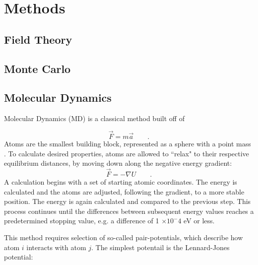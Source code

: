 \documentclass[3p,review,12pt]{elsarticle}
\begin{document}
\section{Methods}


\subsection{Field Theory}

\subsection{Monte Carlo}

\subsection{Molecular Dynamics}

Molecular Dynamics (MD) is a classical method built off of

\begin{equation}
\vec{F}=m\vec{a} \qquad .
\end{equation}
Atoms are the smallest building block, represented as a sphere with a point mass \cite{Lee2012}. To calculate desired properties, atoms are allowed to ``relax" to their respective equilibrium distances, by moving down along the negative energy gradient:
\begin{equation}
\vec{F} = - \nabla U \qquad .
\end{equation}
A calculation begins with a set of starting atomic coordinates. The energy is calculated and the atoms are adjusted, following the gradient, to a more stable position. The energy is again calculated and compared to the previous step. This process continues until the differences between subsequent energy values reaches a predetermined stopping value, e.g. a difference of 1 $\times 10^-4$ eV or less.
\par
This method requires selection of so-called pair-potentials, which describe how atom $i$ interacts with atom $j$. The simplest potentail is the Lennard-Jones potential:
\end{document}
